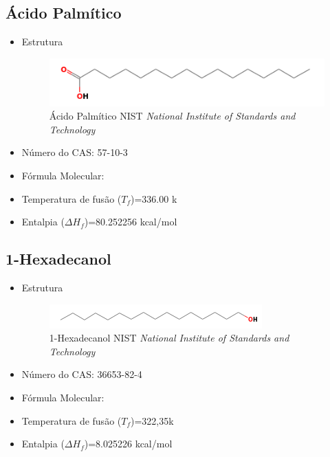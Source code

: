 	\subsection{Ácido Palmítico}
	\label{sec:3}
	\begin{itemize}
		\item Estrutura
		\begin{figure}[H]
			\centering
			\includegraphics[width=0.65\linewidth]{dados/figuras/Ac_palmitico.png}
			\caption[Ácido Palmítico]{Ácido Palmítico NIST \textit{National Institute of Standards and Technology}}
			\label{fig:nist3}
		\end{figure}
		\item Número do CAS: 57-10-3
		\item Fórmula Molecular: 
		\item Temperatura de fusão ($T_f$)=336.00 k
		\item Entalpia ($\Delta H_{f}$)=80.252256 kcal/mol
	\end{itemize}
	
	\subsection{1-Hexadecanol}
	\label{sec:4}
	\begin{itemize}
		\item Estrutura
		\begin{figure}[H]
			\centering
			\includegraphics[width=0.8\linewidth]{dados/figuras/Hexadecanol.png}
			\caption[1-Hexadecanol]{1-Hexadecanol NIST \textit{National Institute of Standards and Technology}}
			\label{fig:8}
		\end{figure}
		\item Número do CAS: 36653-82-4
		\item Fórmula Molecular:
		\item Temperatura de fusão ($T_f$)=322,35k
		\item Entalpia ($\Delta H_{f}$)=8.025226 kcal/mol
	\end{itemize}
	
